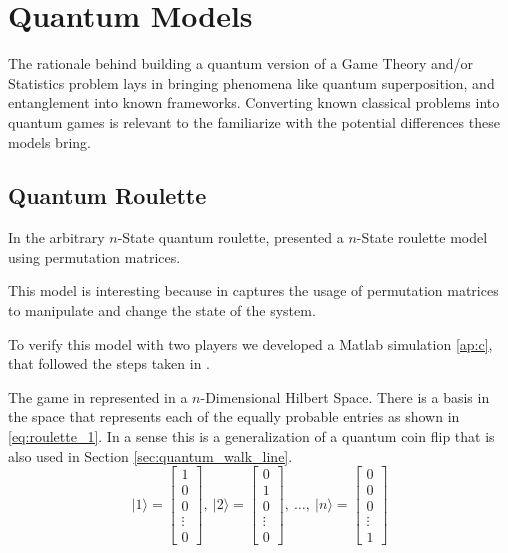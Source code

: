 \clearpage
\section{Quantum Models}
\label{sec:quantum_models}

The rationale behind building a quantum version of a Game Theory and/or Statistics problem lays in bringing phenomena like quantum superposition, and entanglement into known frameworks. Converting known classical problems into quantum games is relevant to the familiarize with the potential differences these models bring.

\subsection{Quantum Roulette}
\label{subsec:quantum_roulette}

In the arbitrary $n$-State quantum roulette,\cite{Salimi2009} presented a $n$-State roulette model using permutation matrices. 

This model is interesting because in captures the usage of permutation matrices to manipulate and change the state of the system.

To verify this model with two players we developed a Matlab simulation \ref{ap:c}, that followed the steps taken in \cite{Salimi2009}.

The game in represented in a $n$-Dimensional Hilbert Space. There is a basis in the space that represents each of the equally probable entries as shown in \eqref{eq:roulette_1}. In a sense this is a generalization of a quantum coin flip that is also used in Section \ref{sec:quantum_walk_line}.
\begin{equation}
\label{eq:roulette_1}
\vert1\rangle=\left[\begin{array}{c}
1\\
0\\
0\\
\vdots\\
0
\end{array}\right],\:\vert2\rangle=\left[\begin{array}{c}
0\\
1\\
0\\
\vdots\\
0
\end{array}\right],\:\ldots,\:\vert n\rangle=\left[\begin{array}{c}
0\\
0\\
0\\
\vdots\\
1
\end{array}\right]
\end{equation}

